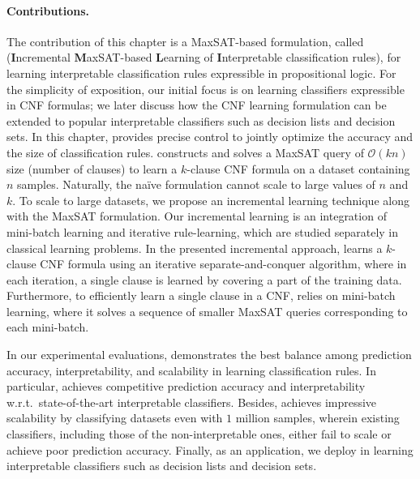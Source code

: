 \paragraph{Contributions.} The contribution of this chapter is a MaxSAT-based formulation, called {\imli} (\textbf{I}ncremental \textbf{M}axSAT-based \textbf{L}earning of \textbf{I}nterpretable classification rules), for learning interpretable classification rules expressible in propositional logic. For the simplicity of exposition, our initial focus is on learning classifiers expressible in CNF formulas; we later discuss how the CNF learning formulation can be extended to popular interpretable classifiers such as decision lists and decision sets. In this chapter, {\imli} provides precise control to jointly optimize the accuracy and the size of classification rules. {\imli} constructs and solves a MaxSAT query of $ \mathcal{O}(kn) $  size (number of clauses) to learn a $ k $-clause CNF formula on a dataset containing $ n $ samples. Naturally, the na\"ive formulation cannot scale to large values of $ n $ and $ k $. To scale {\imli} to large datasets, we propose an incremental learning technique along with the MaxSAT formulation. Our incremental learning is an integration of mini-batch learning and iterative rule-learning, which are studied separately in classical learning problems. In the presented incremental approach, {\imli} learns a $ k $-clause CNF formula using an iterative separate-and-conquer algorithm, where in each iteration, a single clause is learned by covering a part of the training data. Furthermore, to efficiently learn a single clause in a CNF, {\imli} relies on mini-batch learning, where it solves a sequence of smaller MaxSAT queries corresponding to each mini-batch. 



In our experimental evaluations, {\imli} demonstrates the best balance among prediction accuracy, interpretability, and scalability in learning classification rules. In particular, {\imli} achieves competitive prediction accuracy and interpretability w.r.t.\ state-of-the-art interpretable classifiers. Besides, {\imli} achieves impressive scalability by classifying datasets even with $ 1 $ million samples, wherein existing classifiers, including those of the non-interpretable ones, either fail to scale or achieve poor prediction accuracy. Finally, as an application, we deploy {\imli} in learning interpretable classifiers such as decision lists and decision sets.



